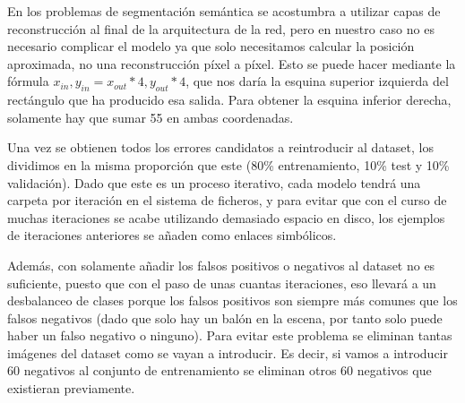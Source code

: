 En los problemas de segmentación semántica se acostumbra a utilizar capas de reconstrucción al final de la arquitectura de la red, pero en nuestro caso no es necesario complicar el modelo ya que solo necesitamos calcular la posición aproximada, no una reconstrucción píxel a píxel. Esto se puede hacer mediante la fórmula $x_{in},y_{in} = x_{out} * 4, y_{out} * 4$, que nos daría la esquina superior izquierda del rectángulo que ha producido esa salida. Para obtener la esquina inferior derecha, solamente hay que sumar 55 en ambas coordenadas.

Una vez se obtienen todos los errores candidatos a reintroducir al dataset, los dividimos en la misma proporción que este (80\% entrenamiento, 10\% test y 10\% validación). Dado que este es un proceso iterativo, cada modelo tendrá una carpeta por iteración en el sistema de ficheros, y para evitar que con el curso de muchas iteraciones se acabe utilizando demasiado espacio en disco, los ejemplos de iteraciones anteriores se añaden como enlaces simbólicos.

Además, con solamente añadir los falsos positivos o negativos al dataset no es suficiente, puesto que con el paso de unas cuantas iteraciones, eso llevará a un desbalanceo de clases porque los falsos positivos son siempre más comunes que los falsos negativos (dado que solo hay un balón en la escena, por tanto solo puede haber un falso negativo o ninguno). Para evitar este problema se eliminan tantas imágenes del dataset como se vayan a introducir. Es decir, si vamos a introducir 60 negativos al conjunto de entrenamiento se eliminan otros 60 negativos que existieran previamente.

